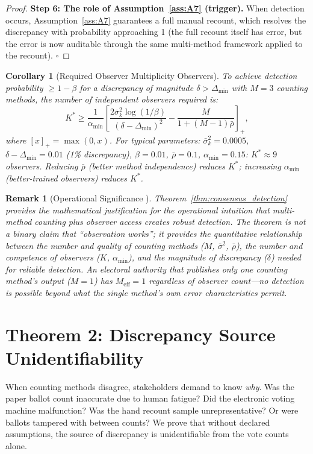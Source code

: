 \documentclass[11pt,a4paper]{article}
\newtheorem{corollary}[theorem]{Corollary}
\newtheorem{remark}[theorem]{Remark}
\theoremstyle{definition}
\begin{document}
\begin{proof}
\textbf{Step 6: The role of Assumption~\ref{ass:A7} (trigger).} When detection occurs, Assumption~\ref{ass:A7} guarantees a full manual recount, which resolves the discrepancy with probability approaching 1 (the full recount itself has error, but the error is now auditable through the same multi-method framework applied to the recount). $\square$
\end{proof}
\begin{corollary}[Required Observer Multiplicity Observers]
\label{cor:observer_count}
To achieve detection probability $\geq 1 - \beta$ for a discrepancy of magnitude $\delta > \Delta_{\min}$ with $M = 3$ counting methods, the number of independent observers required is:
\begin{equation}
    K^* \geq \frac{1}{\alpha_{\min}} \left[\frac{2\bar{\sigma}_k^2 \log(1/\beta)}{(\delta - \Delta_{\min})^2} - \frac{M}{1 + (M-1)\bar{\rho}}\right]_{+},
    \label{eq:K_star}
\end{equation}
where $[x]_+ = \max(0, x)$. For typical parameters: $\bar{\sigma}_k^2 = 0.0005$, $\delta - \Delta_{\min} = 0.01$ (1\% discrepancy), $\beta = 0.01$, $\bar{\rho} = 0.1$, $\alpha_{\min} = 0.15$: $K^* \approx 9$ observers. Reducing $\bar{\rho}$ (better method independence) reduces $K^*$; increasing $\alpha_{\min}$ (better-trained observers) reduces $K^*$.
\end{corollary}
\begin{remark}[Operational Significance ]
\label{rem:ops_sig}
Theorem~\ref{thm:consensus_detection} provides the mathematical justification for the operational intuition that multi-method counting plus observer access creates robust detection. The theorem is \textit{not} a binary claim that ``observation works''; it provides the quantitative relationship between the number and quality of counting methods ($M$, $\bar{\sigma}^2$, $\bar{\rho}$), the number and competence of observers ($K$, $\alpha_{\min}$), and the magnitude of discrepancy ($\delta$) needed for reliable detection. An electoral authority that publishes only one counting method's output ($M = 1$) has $M_{\text{eff}} = 1$ regardless of observer count---no detection is possible beyond what the single method's own error characteristics permit.
\end{remark}
\section{Theorem 2: Discrepancy Source Unidentifiability}
\label{sec:thm2}
When counting methods disagree, stakeholders demand to know \textit{why}. Was the paper ballot count inaccurate due to human fatigue? Did the electronic voting machine malfunction? Was the hand recount sample unrepresentative? Or were ballots tampered with between counts? We prove that without declared assumptions, the source of discrepancy is unidentifiable from the vote counts alone.
\end{document}
